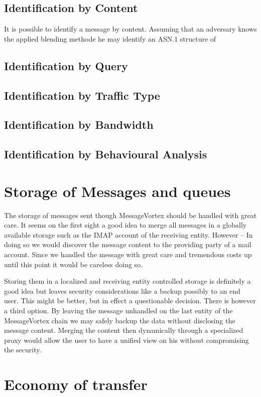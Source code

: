 
\subsection{Identification by Content}
It is possible to identify a message by content. Assuming that an adversary knows the applied blending methode he may identify an ASN.1 structure of 


\subsection{Identification by Query}


\subsection{Identification by Traffic Type}


\subsection{Identification by Bandwidth}


\subsection{Identification by Behavioural Analysis}


\section{Storage of Messages and queues}
The storage of messages sent though MessageVortex should be handled with great care. It seems on the first sight a good idea to merge all messages in a globally available storage such as the IMAP account of the receiving entity. However -- In doing so we would discover the message content to the providing party of a mail account. Since we handled the message with great care and tremendous costs up until this point it would be careless doing so. 

Storing them in a localized and receiving entity controlled storage is definitely a good idea but leaves security considerations like a backup possibly to an end user. This might be better, but in effect a questionable decision. There is however a third option. By leaving the message unhandled on the last entity of the MessageVortex chain we may safely backup the data without disclosing the message content. Merging the content then dynamically through a specialized proxy would allow the user to have a unified view on his without compromising the security.


\section{Economy of transfer}

